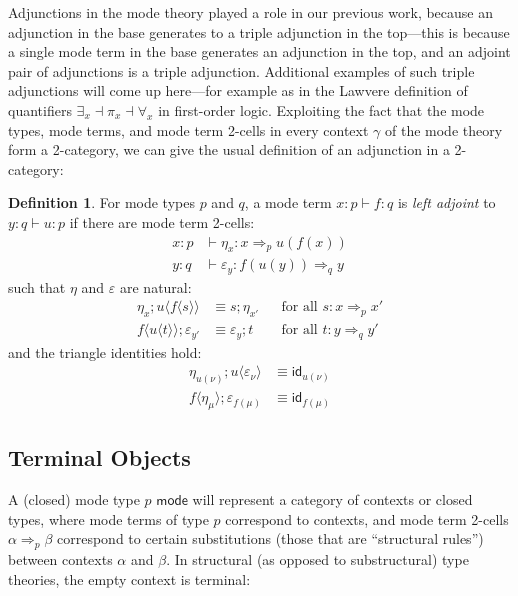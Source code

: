 \documentclass[10pt]{article}
\theoremstyle{definition}
\newtheorem{definition}{Definition}
\newcommand{\yields}{\vdash}
\newcommand{\tcell}{\Rightarrow}
\newcommand{\type}{\,\,\mathsf{mode}}
\newcommand{\id}{\mathsf{id}}
\newcommand\ap[2]{\ensuremath{#1 \langle #2 \rangle }}
\begin{document}
Adjunctions in the mode theory played a role in our previous work,
because an adjunction in the base generates to a triple adjunction in
the top---this is because a single mode term in the base generates an
adjunction in the top, and an adjoint pair of adjunctions is a triple
adjunction.  Additional examples of such triple adjunctions will come up
here---for example as in the Lawvere definition of quantifiers
$\exists_x \dashv \pi_x \dashv \forall_x$ in first-order logic.
Exploiting the fact that the mode types, mode terms, and mode term
2-cells in every context $\gamma$ of the mode theory form a 2-category,
we can give the usual definition of an adjunction in a 2-category:

\begin{definition} \label{def:adjunction}
For mode types $p$ and $q$, a mode term $x : p \yields f : q$ is
\emph{left adjoint} to $y : q \yields u : p$ if there are mode term
2-cells:
\begin{align*}
 x : p &\yields \eta_x : x \tcell_p u(f(x)) \\
 y : q &\yields \varepsilon_y : f(u(y)) \tcell_q y
\end{align*}
such that $\eta$ and $\varepsilon$ are natural:
\begin{align}
\eta_x ; \ap{u}{\ap{f}{s}} &\equiv s ; \eta_{x'} && \text{for all } s : x \tcell_p x'  \\
\ap{f}{\ap{u}{t}} ; \varepsilon_{y'}  &\equiv \varepsilon_y ; t && \text{for all } t : y \tcell_q y'
\end{align}
and the triangle identities hold:
\begin{align}
\eta_{u(\nu)};\ap{u}{\varepsilon_\nu} &\equiv \id_{u(\nu)} \\
\ap{f}{\eta_\mu};\varepsilon_{f(\mu)} &\equiv \id_{f(\mu)}
\end{align}
\end{definition}

\subsection{Terminal Objects}

A (closed) mode type $p \type$ will represent a category of contexts or
closed types, where mode terms of type $p$ correspond to contexts, and
mode term 2-cells $\alpha \tcell_p \beta$ correspond to certain
substitutions (those that are ``structural rules'') between contexts
$\alpha$ and $\beta$.  In structural (as opposed to substructural) type
theories, the empty context is terminal:
\end{document}
